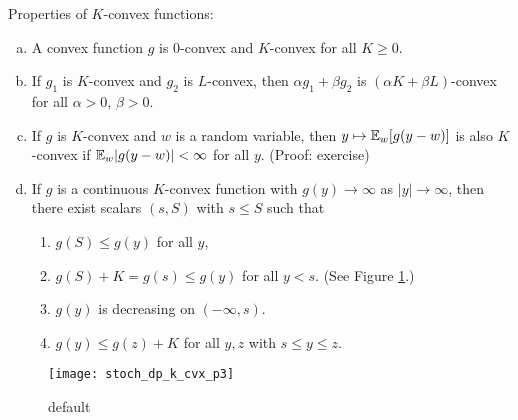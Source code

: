 \begin{proposition}\label{stoch.dp.prop.k.cvx}

Properties of \(K\)-convex functions:

\begin{enumerate}[(a)]

\item A convex function \(g\) is 0-convex and \(K\)-convex for all \( K \geq 0\).

\item If \(g_1\) is \(K\)-convex and \(g_2\) is \(L\)-convex, then \(\alpha g_1 + \beta g_2\) is \((\alpha K + \beta L )\)-convex for all \(\alpha > 0\), \(\beta >0\).

\item If \(g\) is \(K\)-convex and \(w\) is a random variable, then \(y \mapsto \mathbb{E}_w[ g(y- w)]\) is also \(K\)-convex if \(\mathbb{E}_w |g(y-w)| < \infty\) for all \(y\). (Proof: exercise)

\item If \(g\) is a continuous \(K\)-convex function with \(g(y) \to \infty\) as \(|y| \to \infty\), then there exist scalars \((s, S)\) with \(s \leq S\) such that 

\begin{enumerate}[(1)]

\item \(g(S) \leq g(y)\) for all \(y\),

\item \(g(S) + K = g(s) \leq g(y)\) for all \(y < s\). (See Figure \ref{stoch_dp_k_cvx_p3_fig}.)

\item \(g(y)\) is decreasing on \((- \infty, s)\). 



\item \(g(y) \leq g(z) + K\) for all \(y, z\) with \(s \leq y \leq z\).

\end{enumerate}



\end{enumerate}

\begin{figure}[htbp]
\begin{center}
\texttt{[image: stoch\_dp\_k\_cvx\_p3]}
\caption{default}
\label{stoch_dp_k_cvx_p3_fig}
\end{center}
\end{figure}

\end{proposition}

